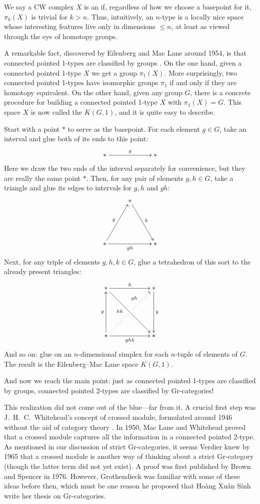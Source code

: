 \documentclass[reqno,12pt]{amsart}
\newcommand{\define}[1]{\textbf{\boldmath{#1}}}
\theoremstyle{definition}
\begin{document}
We say a CW complex $X$ is an \define{$n$-type} if, regardless of how we choose a basepoint for it, $\pi_k(X)$ is trivial for $k > n$.  Thus, intuitively, an $n$-type is a locally nice space whose interesting features live only in dimensions $\le n$, at least as viewed through the eye of homotopy groups.  

A remarkable fact, discovered by Eilenberg and Mac Lane around 1954, is that connected pointed 1-types are classified by groups \cite{EM54,EM55}.   On the one hand, given a connected pointed 1-type $X$ we get a group $\pi_1(X)$.   More surprisingly, two connected pointed 1-types have isomorphic groups $\pi_1$ if and only if they are homotopy equivalent.   On the other hand, given any group $G$, there is a concrete procedure for building a connected pointed 1-type $X$ with $\pi_1(X) = G$.   This space $X$ is now called the \define{Eilenberg--Mac Lane space} $K(G,1)$, and it is quite easy to describe.

Start with a point $\ast$ to serve as the basepoint.  For each element $g \in G$, take an interval and glue both of its ends to this point:
\[
\xy 0;/r3pc/:
   (0,0)*+{\ast}="x";
    (2,0)*+{\ast}="z";
 {\ar^{g} "x";"z"};
\endxy
\]
Here we draw the two ends of the interval separately for convenience, but they are really the same point $\ast$. Then, for any pair of elements $g,h \in G$, take a triangle and glue its edges to intervals for $g, h$ and $gh$:
\[
\xy 0;/r3pc/:
   (0,0)*+{\ast}="x";
    (1,1.7)*+{\ast}="y";
    (2,0)*+{\ast}="z";
 {\ar^{g} "x";"y"};
 {\ar^{h} "y";"z"};
 {\ar_{gh} "x";"z"};
\endxy
\]
Next, for any triple of elements $g,h,k \in G$, glue a tetrahedron of this sort to the already present triangles:
\[
{\xy 
(12,-12)*+{\ast}="1"; 
(12,12)*+{\ast}="2"; 
(-12,12)*+{\ast}="3"; 
(-12,-12)*+{\ast}="4"; 
(0,0)*+{}="0"; 
{\ar^-{k} "2";"1"}; 
{\ar^-{h} "3";"2"}; 
{\ar^-{g} "4";"3"};
{\ar_-{ghk} "4";"1"};
{\ar@{.>}^(0.4){\phantom{ab}gh} "0";"2"};
{\ar@{.} "4";"0"};
{\ar_(0.4){hk} "3";"1"};
\endxy}
\]
And so on: glue on an $n$-dimensional simplex for each $n$-tuple
of elements of $G$.   The result is the Eilenberg--Mac Lane space
$K(G,1)$.

And now we reach the main point: just as connected pointed 1-types are classified by groups, connected pointed 2-types are classified by Gr-categories!  

This realization did not come out of the blue---far from it.  A crucial first step was J.\ H.\ C.\ Whitehead's concept of crossed module, formulated around 1946 without the aid of category theory \cite{W46,W49}.  In 1950, Mac Lane and Whitehead \cite{MW} proved that a crossed module captures all the information in a connected pointed 2-type.   As mentioned in our discussion of strict Gr-categories, it seems Verdier knew by 1965 that a crossed module is another way of thinking about a strict Gr-category (though the latter term did not yet exist).  A proof was first published by Brown and Spencer \cite{BS76} in 1976.  However, Grothendieck was familiar with some of these ideas before then, which must be one reason he proposed that Ho\`ang Xu\^an S\'inh write her thesis on Gr-categories. 
\end{document}

